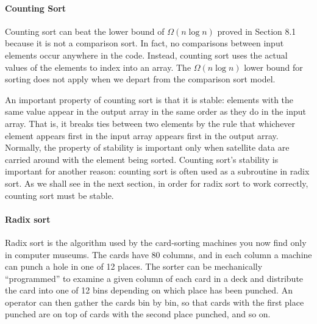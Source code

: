 \paragraph{Counting Sort}
Counting sort can beat the lower bound of $\Omega\left(n \log n\right)$ proved in Section 8.1 because it is not a comparison sort. In fact, no comparisons between input elements occur anywhere in the code. Instead, counting sort uses the actual values of the elements to index into an array. The $\Omega\left(n \log n\right)$ lower bound for sorting does not apply when we depart from the comparison sort model.

An important property of counting sort is that it is stable: elements with the same value appear in the output array in the same order as they do in the input array. That is, it breaks ties between two elements by the rule that whichever element appears first in the input array appears first in the output array. Normally, the property of stability is important only when satellite data are carried around with the element being sorted. Counting sort’s stability is important for another reason: counting sort is often used as a subroutine in radix sort. As we shall see in the next section, in order for radix sort to work correctly, counting sort must be stable.

\paragraph{Radix sort}
Radix sort is the algorithm used by the card-sorting machines you now find only in computer museums. The cards have 80 columns, and in each column a machine can punch a hole in one of 12 places. The sorter can be mechanically “programmed” to examine a given column of each card in a deck and distribute the card into one of 12 bins depending on which place has been punched. An operator can then gather the cards bin by bin, so that cards with the first place punched are on top of cards with the second place punched, and so on.

